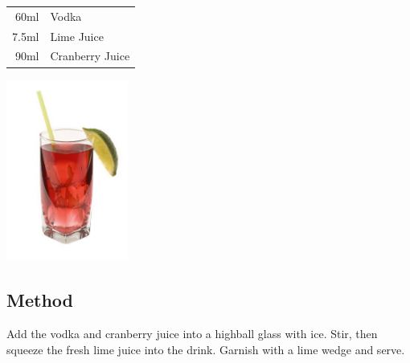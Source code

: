 \documentclass[12pt, letterpaper]{article}
\begin{document}
\begin{multicols}{2}

\begin{tabular} { r | l}
    60ml & Vodka \\
    7.5ml & Lime Juice \\
    90ml & Cranberry Juice
\end{tabular}

\includegraphics[height=6cm]{cape_codder}

\end{multicols}

\subsection*{Method}
Add the vodka and cranberry juice into a highball glass with ice.
Stir, then squeeze the fresh lime juice into the drink. Garnish with a lime wedge and serve.
\end{document}
